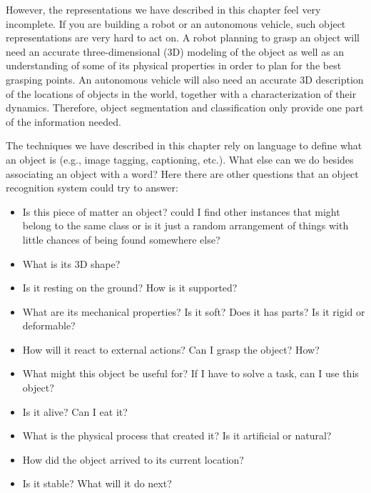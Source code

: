 However, the representations we have described in this chapter feel very incomplete. If you are building a robot or an autonomous vehicle, such object representations are very hard to act on. A robot planning to grasp an object will need an accurate three-dimensional (3D) modeling of the object as well as an understanding of some of its physical properties in order to plan for the best grasping points. An autonomous vehicle will also need an accurate 3D description of the locations of objects in the world, together with a characterization of their dynamics. Therefore, object segmentation and classification only provide one part of the information needed.



The techniques we have described in this chapter rely on language to define what an object is (e.g., image tagging, captioning, etc.). What else can we do besides associating an object with a word? Here there are other questions that an object recognition system could try to answer:
\begin{itemize}
\item Is this piece of matter an object? could I find other instances that might belong to the same class or is it just a random arrangement of things with little chances of being found somewhere else?
\item What is its 3D shape?
\item Is it resting on the ground? How is it supported? 
\item What are its mechanical properties? Is it soft? Does it has parts? Is it rigid or deformable?
\item How will it react to external actions? Can I grasp the object? How? 
\item What might this object be useful for? If I have to solve a task, can I use this object?
\item Is it alive? Can I eat it?
\item What is the physical process that created it? Is it artificial or  natural? 
\item How did the object arrived to its current location? 
\item Is it stable? What will it do next? 
\end{itemize}

